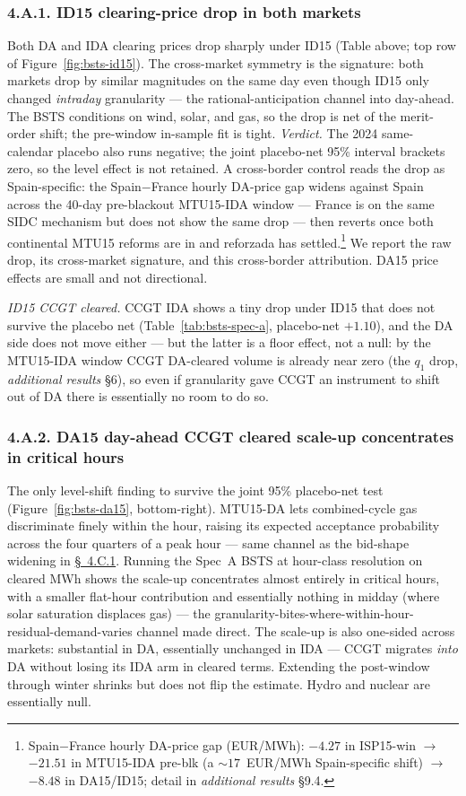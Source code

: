 \documentclass[11pt]{article}
\begin{document}
\subsubsection*{4.A.1. ID15 clearing-price drop in both markets}\label{sec:4ii}
Both DA and IDA clearing prices drop sharply under ID15 (Table above; top row of Figure~\ref{fig:bsts-id15}). The cross-market symmetry is the signature: both markets drop by similar magnitudes on the same day even though ID15 only changed \emph{intraday} granularity --- the rational-anticipation channel into day-ahead. The BSTS conditions on wind, solar, and gas, so the drop is net of the merit-order shift; the pre-window in-sample fit is tight. \emph{Verdict.} The 2024 same-calendar placebo also runs negative; the joint placebo-net 95\% interval brackets zero, so the level effect is not retained. A cross-border control reads the drop as Spain-specific: the Spain$-$France hourly DA-price gap widens against Spain across the 40-day pre-blackout MTU15-IDA window --- France is on the same SIDC mechanism but does not show the same drop --- then reverts once both continental MTU15 reforms are in and reforzada has settled.\footnote{Spain$-$France hourly DA-price gap (EUR/MWh): $-4.27$ in ISP15-win $\to$ $-21.51$ in MTU15-IDA pre-blk (a $\sim\!17$~EUR/MWh Spain-specific shift) $\to$ $-8.48$ in DA15/ID15; detail in \emph{additional results} \S 9.4.} We report the raw drop, its cross-market signature, and this cross-border attribution. DA15 price effects are small and not directional.

\emph{ID15 CCGT cleared.} CCGT IDA shows a tiny drop under ID15 that does not survive the placebo net (Table~\ref{tab:bsts-spec-a}, placebo-net $+1.10$), and the DA side does not move either --- but the latter is a floor effect, not a null: by the MTU15-IDA window CCGT DA-cleared volume is already near zero (the $q_1$ drop, \emph{additional results} \S 6), so even if granularity gave CCGT an instrument to shift out of DA there is essentially no room to do so.

\subsubsection*{4.A.2. DA15 day-ahead CCGT cleared scale-up concentrates in critical hours}\label{sec:4iii}
The only level-shift finding to survive the joint 95\% placebo-net test (Figure~\ref{fig:bsts-da15}, bottom-right). MTU15-DA lets combined-cycle gas discriminate finely within the hour, raising its expected acceptance probability across the four quarters of a peak hour --- same channel as the bid-shape widening in \hyperref[sec:4i]{\S~4.C.1}. Running the Spec~A BSTS at hour-class resolution on cleared MWh shows the scale-up concentrates almost entirely in critical hours, with a smaller flat-hour contribution and essentially nothing in midday (where solar saturation displaces gas) --- the granularity-bites-where-within-hour-residual-demand-varies channel made direct. The scale-up is also one-sided across markets: substantial in DA, essentially unchanged in IDA --- CCGT migrates \emph{into} DA without losing its IDA arm in cleared terms. Extending the post-window through winter shrinks but does not flip the estimate. Hydro and nuclear are essentially null.
\end{document}
